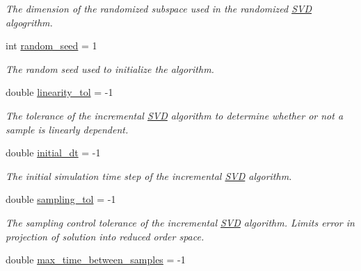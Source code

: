 \begin{DoxyCompactItemize}
\begin{DoxyCompactList}\small\item\em The dimension of the randomized subspace used in the randomized \hyperlink{class_c_a_r_o_m_1_1_s_v_d}{S\-V\-D} algogrithm. \end{DoxyCompactList}\item 
\hypertarget{class_c_a_r_o_m_1_1_options_aeb26a358e68fb7064ad16eec153e5b10}{int \hyperlink{class_c_a_r_o_m_1_1_options_aeb26a358e68fb7064ad16eec153e5b10}{random\-\_\-seed} = 1}\label{class_c_a_r_o_m_1_1_options_aeb26a358e68fb7064ad16eec153e5b10}

\begin{DoxyCompactList}\small\item\em The random seed used to initialize the algorithm. \end{DoxyCompactList}\item 
\hypertarget{class_c_a_r_o_m_1_1_options_a5651dca03c7c47395cb9ce97758cd0d2}{double \hyperlink{class_c_a_r_o_m_1_1_options_a5651dca03c7c47395cb9ce97758cd0d2}{linearity\-\_\-tol} = -\/1}\label{class_c_a_r_o_m_1_1_options_a5651dca03c7c47395cb9ce97758cd0d2}

\begin{DoxyCompactList}\small\item\em The tolerance of the incremental \hyperlink{class_c_a_r_o_m_1_1_s_v_d}{S\-V\-D} algorithm to determine whether or not a sample is linearly dependent. \end{DoxyCompactList}\item 
\hypertarget{class_c_a_r_o_m_1_1_options_accd24e67958038456cb8bab11c0e781c}{double \hyperlink{class_c_a_r_o_m_1_1_options_accd24e67958038456cb8bab11c0e781c}{initial\-\_\-dt} = -\/1}\label{class_c_a_r_o_m_1_1_options_accd24e67958038456cb8bab11c0e781c}

\begin{DoxyCompactList}\small\item\em The initial simulation time step of the incremental \hyperlink{class_c_a_r_o_m_1_1_s_v_d}{S\-V\-D} algorithm. \end{DoxyCompactList}\item 
\hypertarget{class_c_a_r_o_m_1_1_options_a6ab3cb5c3dd848e354d0ca4cbc30aea5}{double \hyperlink{class_c_a_r_o_m_1_1_options_a6ab3cb5c3dd848e354d0ca4cbc30aea5}{sampling\-\_\-tol} = -\/1}\label{class_c_a_r_o_m_1_1_options_a6ab3cb5c3dd848e354d0ca4cbc30aea5}

\begin{DoxyCompactList}\small\item\em The sampling control tolerance of the incremental \hyperlink{class_c_a_r_o_m_1_1_s_v_d}{S\-V\-D} algorithm. Limits error in projection of solution into reduced order space. \end{DoxyCompactList}\item 
\hypertarget{class_c_a_r_o_m_1_1_options_a0c22532e19d6e6405524ab4e327a0a9c}{double \hyperlink{class_c_a_r_o_m_1_1_options_a0c22532e19d6e6405524ab4e327a0a9c}{max\-\_\-time\-\_\-between\-\_\-samples} = -\/1}\label{class_c_a_r_o_m_1_1_options_a0c22532e19d6e6405524ab4e327a0a9c}


\end{DoxyCompactItemize}
